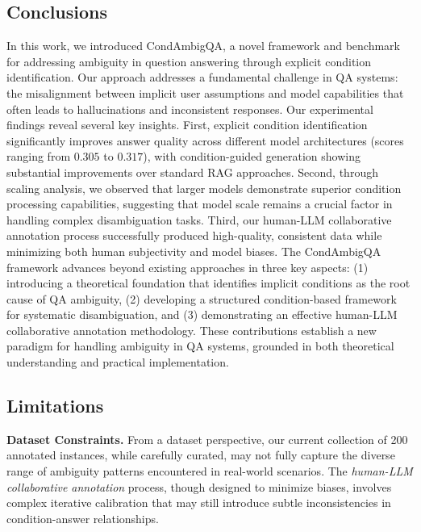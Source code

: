 
\subsection{Conclusions}
In this work, we introduced CondAmbigQA, a novel framework and benchmark for addressing ambiguity in question answering through explicit condition identification. Our approach addresses a fundamental challenge in QA systems: the misalignment between implicit user assumptions and model capabilities that often leads to hallucinations and inconsistent responses.
Our experimental findings reveal several key insights. First, explicit condition identification significantly improves answer quality across different model architectures (scores ranging from $0.305$ to $0.317$), with condition-guided generation showing substantial improvements over standard RAG approaches.%
Second, through scaling analysis, we observed that larger models demonstrate superior condition processing capabilities, suggesting that model scale remains a crucial factor in handling complex disambiguation tasks. Third, our human-LLM collaborative annotation process successfully produced high-quality, consistent data while minimizing both human subjectivity and model biases.
The CondAmbigQA framework advances beyond existing approaches \cite{min-etal-2020-ambigqa,stelmakh-etal-2022-asqa} in three key aspects: (1) introducing a theoretical foundation that identifies implicit conditions as the root cause of QA ambiguity, (2) developing a structured condition-based framework for systematic disambiguation, and (3) demonstrating an effective human-LLM collaborative annotation methodology. These contributions establish a new paradigm for handling ambiguity in QA systems, grounded in both theoretical understanding and practical implementation.
\subsection{Limitations}
\textbf{Dataset Constraints.} From a dataset perspective, our current collection of 200 annotated instances, while carefully curated, may not fully capture the diverse range of ambiguity patterns encountered in real-world scenarios. The \textit{human-LLM collaborative annotation} process, though designed to minimize biases, involves complex iterative calibration that may still introduce subtle inconsistencies in condition-answer relationships.

